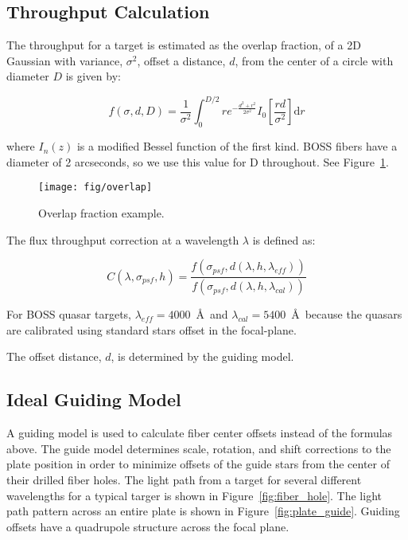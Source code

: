 \documentclass[useAMS,usenatbib]{mn2e}
\providecommand{\fig}[1]{Figure~\ref{fig:#1}}
\begin{document}
\subsection{Throughput Calculation}

The throughput for a target is estimated as the overlap fraction, of a 2D Gaussian with variance, $\sigma^2$, offset a distance, $d$, from the center of a circle with diameter $D$ is given by:

\begin{equation}
\label{eq:overlap}
f(\sigma,d,D) = \frac{1}{\sigma ^2}\int_{0}^{D/2}  r e^{-\frac{d^2+r^2}{2 \sigma ^2}} I_{0}\left[\frac{r d}{\sigma ^2}\right] \mathrm{d}r
\end{equation}

where $I_n(z)$ is a modified Bessel function of the first kind. BOSS fibers have a diameter of 2 arcseconds, so we use this value for D throughout. See \fig{overlap}.

\begin{figure}
\centering
\texttt{[image: fig/overlap]}
\caption{Overlap fraction example.}
\label{fig:overlap}
\end{figure}

The flux throughput correction at a wavelength $\lambda$ is defined as:

\begin{equation}
\label{}
C(\lambda,\sigma_{psf},h) = \frac{f(\sigma_{psf},d(\lambda,h,\lambda_{eff}))}{f(\sigma_{psf},d(\lambda,h,\lambda_{cal}))}
\end{equation}

For BOSS quasar targets, $\lambda_{eff} = 4000$~\AA~and $\lambda_{cal} = 5400$~\AA~because the quasars are calibrated using standard stars offset in the focal-plane. 

The offset distance, $d$, is determined by the guiding model.

\subsection{Ideal Guiding Model}

A guiding model is used to calculate fiber center offsets instead of the formulas above. The guide model determines scale, rotation, and shift corrections to the plate position in order to minimize offsets of the guide stars from the center of their drilled fiber holes. The light path from a target for several different wavelengths for a typical targer is shown in \fig{fiber_hole}. The light path pattern across an entire plate is shown in \fig{plate_guide}. Guiding offsets have a quadrupole structure across the focal plane.
\end{document}
